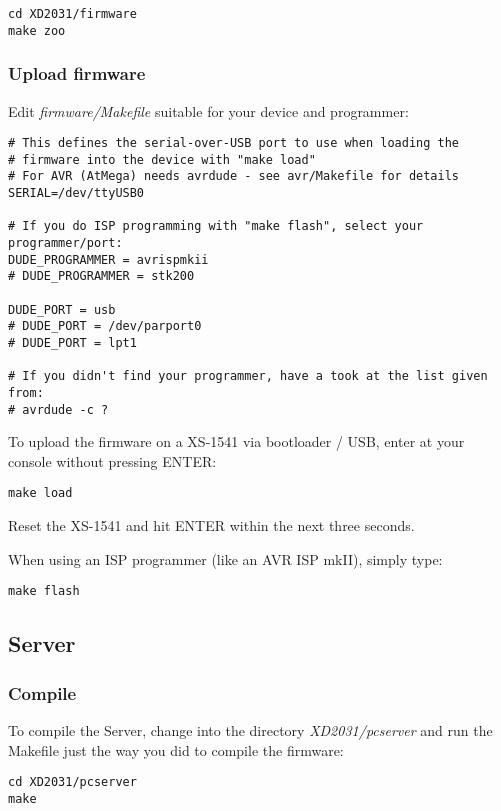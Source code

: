 \begin{verbatim}
cd XD2031/firmware
make zoo
\end{verbatim}

\subsubsection{Upload firmware}
Edit \textit{firmware/Makefile} suitable for your device and programmer:

\begin{verbatim}
# This defines the serial-over-USB port to use when loading the
# firmware into the device with "make load"
# For AVR (AtMega) needs avrdude - see avr/Makefile for details
SERIAL=/dev/ttyUSB0

# If you do ISP programming with "make flash", select your programmer/port:
DUDE_PROGRAMMER = avrispmkii
# DUDE_PROGRAMMER = stk200

DUDE_PORT = usb
# DUDE_PORT = /dev/parport0
# DUDE_PORT = lpt1

# If you didn't find your programmer, have a took at the list given from:
# avrdude -c ?
\end{verbatim}

To upload the firmware on a XS-1541 via bootloader / USB, enter at your
console without pressing ENTER:

\begin{verbatim}
make load
\end{verbatim}

Reset the XS-1541 and hit ENTER within the next three seconds.

When using an ISP programmer (like an AVR ISP mkII), simply type:

\begin{verbatim}
make flash
\end{verbatim}

\subsection{Server}
\subsubsection{Compile}
To compile the Server, change into the directory \textit{XD2031/pcserver}
and run the Makefile just the way you did to compile the firmware:

\begin{verbatim}
cd XD2031/pcserver
make
\end{verbatim}


